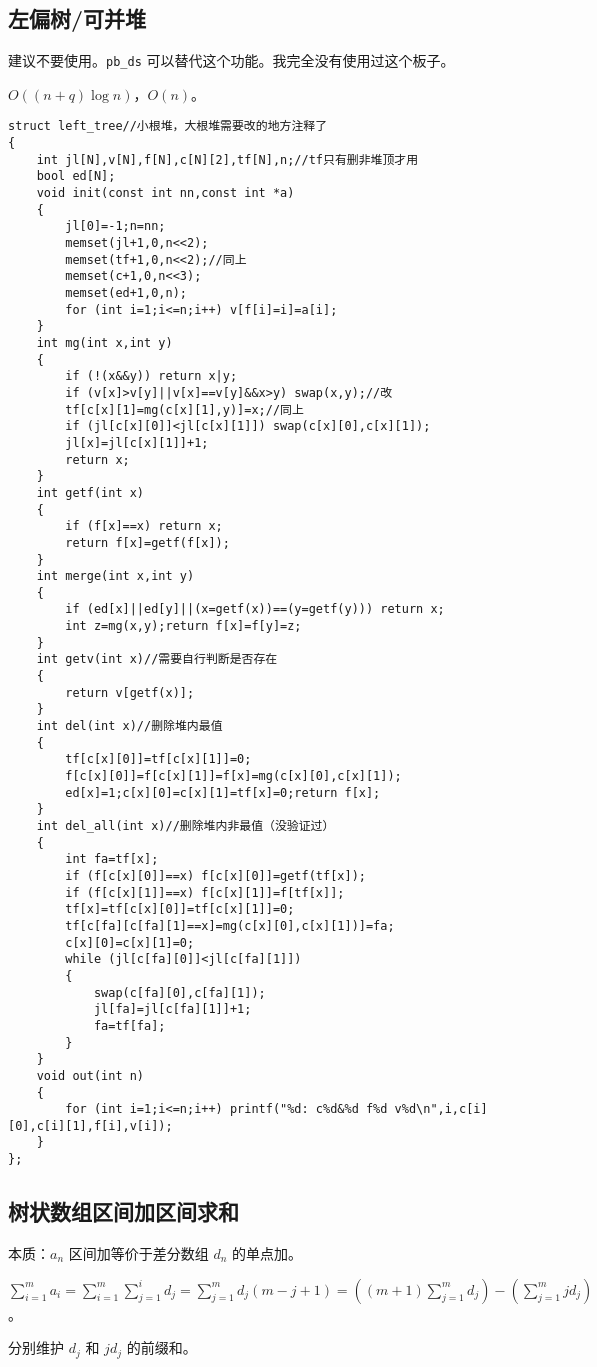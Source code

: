 \documentclass[12pt]{ctexart}
\begin{document}
\subsection{左偏树/可并堆}

建议不要使用。\verb|pb_ds| 可以替代这个功能。我完全没有使用过这个板子。

$O((n+q)\log n)$，$O(n)$。

\begin{lstlisting}
struct left_tree//小根堆，大根堆需要改的地方注释了
{
	int jl[N],v[N],f[N],c[N][2],tf[N],n;//tf只有删非堆顶才用
	bool ed[N];
	void init(const int nn,const int *a)
	{
		jl[0]=-1;n=nn;
		memset(jl+1,0,n<<2);
		memset(tf+1,0,n<<2);//同上
		memset(c+1,0,n<<3);
		memset(ed+1,0,n);
		for (int i=1;i<=n;i++) v[f[i]=i]=a[i];
	}
	int mg(int x,int y)
	{
		if (!(x&&y)) return x|y;
		if (v[x]>v[y]||v[x]==v[y]&&x>y) swap(x,y);//改
		tf[c[x][1]=mg(c[x][1],y)]=x;//同上
		if (jl[c[x][0]]<jl[c[x][1]]) swap(c[x][0],c[x][1]);
		jl[x]=jl[c[x][1]]+1;
		return x;
	}
	int getf(int x)
	{
		if (f[x]==x) return x;
		return f[x]=getf(f[x]);
	}
	int merge(int x,int y)
	{
		if (ed[x]||ed[y]||(x=getf(x))==(y=getf(y))) return x;
		int z=mg(x,y);return f[x]=f[y]=z;
	}
	int getv(int x)//需要自行判断是否存在
	{
		return v[getf(x)];
	}
	int del(int x)//删除堆内最值
	{
		tf[c[x][0]]=tf[c[x][1]]=0;
		f[c[x][0]]=f[c[x][1]]=f[x]=mg(c[x][0],c[x][1]);
		ed[x]=1;c[x][0]=c[x][1]=tf[x]=0;return f[x];
	}
	int del_all(int x)//删除堆内非最值（没验证过）
	{
		int fa=tf[x];
		if (f[c[x][0]]==x) f[c[x][0]]=getf(tf[x]);
		if (f[c[x][1]]==x) f[c[x][1]]=f[tf[x]];
		tf[x]=tf[c[x][0]]=tf[c[x][1]]=0;
		tf[c[fa][c[fa][1]==x]=mg(c[x][0],c[x][1])]=fa;
		c[x][0]=c[x][1]=0;
		while (jl[c[fa][0]]<jl[c[fa][1]])
		{
			swap(c[fa][0],c[fa][1]);
			jl[fa]=jl[c[fa][1]]+1;
			fa=tf[fa];
		}
	}
	void out(int n)
	{
		for (int i=1;i<=n;i++) printf("%d: c%d&%d f%d v%d\n",i,c[i][0],c[i][1],f[i],v[i]);
	}
};
\end{lstlisting}

\subsection{树状数组区间加区间求和}

本质：$a_n$ 区间加等价于差分数组 $d_n$ 的单点加。

$\sum\limits_{i=1}^ma_i =\sum\limits_{i=1}^m\sum\limits_{j=1}^id_j=\sum\limits_{j=1}^md_j(m-j+1)=((m+1)\sum\limits_{j=1}^md_j)-(\sum\limits_{j=1}^mjd_j)$。

分别维护 $d_j$ 和 $jd_j$ 的前缀和。
\end{document}
